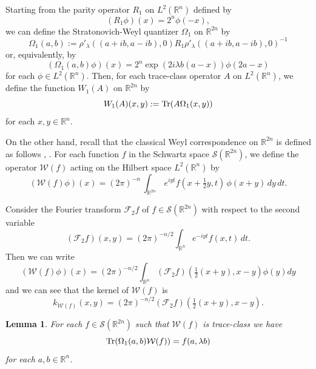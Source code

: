 \documentclass[12pt]{amsart}
\numberwithin{equation}{section}
\newtheorem{lemma}[theorem]{Lemma}
\begin{document}
Starting from the parity operator $R_1$ on $ L^2({\mathbb R}^n)$ defined by
\begin{equation*}(R_1\phi)(x)=2^n\phi(-x), \end{equation*}
we can define the Stratonovich-Weyl quantizer $\Omega_1$ on ${\mathbb R}^{2n}$ by
\begin{equation*}\Omega_1(a,b):=\rho'_{\lambda}((a+ib,a-ib),0)R_1\rho'_{\lambda}((a+ib,a-ib),0)^{-1} \end{equation*} or, equivalently, by
\begin{equation}(\Omega_1(a,b)\phi)(x)=2^n\exp \left(2i{\lambda}b(a-x)\right) \phi(2a-x) \end{equation}
for each $\phi \in L^2({\mathbb R}^n)$.
Then, for each trace-class operator $A$ on $L^2({\mathbb R}^n)$, we define the function 
$W_1(A)$ on ${\mathbb R}^{2n}$ by 
\begin{equation*} W_1(A)(x,y):=\operatorname{Tr}(A\Omega_1(x,y))\end{equation*}
for each $x, y \in {\mathbb R}^n$.

On the other hand, recall that the classical Weyl correspondence on ${\mathbb R}^{2n}$ is defined as follows \cite{Fo}, \cite{Ho1}.
For each function $f$ in the Schwartz space ${\mathcal S}({\mathbb
R}^{2n})$, we define the operator $ {\mathcal W}(f)$ acting on the Hilbert
space $L^2({\mathbb R}^{n})$ by \begin{equation}\label{eqcalWeyl} ({\mathcal W}(f)\phi)
(x)={(2\pi)}^{-n}\,\int_{{\mathbb R}^{2n}}\, e^{i yt} f( x+\tfrac{1}{2}y,
t)\,\phi (x+y)\,dy\,dt.
\end{equation}

Consider the Fourier transform ${\mathcal F}_2f$ of $f\in {\mathcal S}({\mathbb
R}^{2n})$ with respect to the second variable
\begin{equation*}({\mathcal F}_2f)(x,y)={(2\pi)}^{-n/2}\int_{{\mathbb R}^{n}}e^{-i yt
}f(x,t)\,dt.\end{equation*}
Then we can write
\begin{equation*}({\mathcal W}(f)\phi)
(x)={(2\pi)}^{-n/2}\int_{{\mathbb R}^{n}} ({\mathcal F}_2f)(\tfrac{1}{2}(x+y),x-y)\phi(y)dy\end{equation*}
and we can see that the kernel of ${\mathcal W}(f)$ is
\begin{equation*}k_{{\mathcal W}(f)}(x,y)={(2\pi)}^{-n/2}({\mathcal F}_2f)(\tfrac{1}{2}(x+y),x-y).\end{equation*}

\begin{lemma} For each $f\in {\mathcal S}({\mathbb
R}^{2n})$ such that ${\mathcal W}(f)$ is trace-class we have
\begin{equation*}\operatorname{Tr}(\Omega_1(a,b){\mathcal W}(f))=f(a,\lambda b)\end{equation*}
for each $a, b \in {\mathbb R}^{n}$.\end{lemma}
\end{document}
